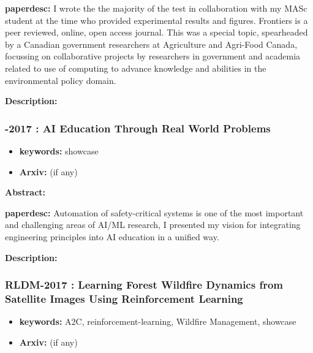 \documentclass{article}
\begin{document}
\textbf{paperdesc:} I wrote the the majority of the test in collaboration with my MASc student at the time who provided experimental results and figures. Frontiers is a peer reviewed, online, open access journal. This was a special topic, spearheaded by a Canadian government researchers at Agriculture and Agri-Food Canada, focussing on collaborative projects by researchers in government and academia related to use of computing to advance knowledge and abilities in the environmental policy domain.

\textbf{Description:} 



\newpage
\subsubsection{\textbf{-2017} : AI Education Through Real World Problems}
\begin{itemize}
\item \textbf{keywords:} showcase
\item \textbf{Arxiv:}  (if any)
\end{itemize}


\textbf{Abstract:} 

\textbf{paperdesc:} Automation of safety-critical systems is one of the most important and challenging areas of AI/ML research, I presented my vision for integrating engineering principles into AI education in a unified way.

\textbf{Description:} 



\newpage
\subsubsection{\textbf{RLDM-2017} : Learning Forest Wildfire Dynamics from Satellite Images Using Reinforcement Learning}
\begin{itemize}
\item \textbf{keywords:} A2C, reinforcement-learning, Wildfire Management, showcase
\item \textbf{Arxiv:}  (if any)
\end{itemize}
\end{document}
